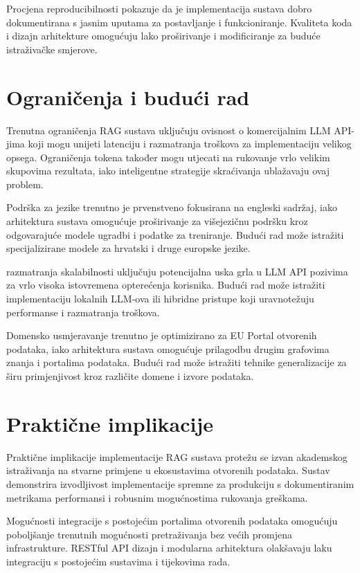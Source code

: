 Procjena reproducibilnosti pokazuje da je implementacija sustava dobro dokumentirana s jasnim uputama za postavljanje i funkcioniranje. Kvaliteta koda i dizajn arhitekture omogućuju lako proširivanje i modificiranje za buduće istraživačke smjerove.

\section{Ograničenja i budući rad}
\label{sec:limitations_future_work}

Trenutna ograničenja RAG sustava uključuju ovisnost o komercijalnim LLM API-jima koji mogu unijeti latenciju i razmatranja troškova za implementaciju velikog opsega. Ograničenja tokena također mogu utjecati na rukovanje vrlo velikim skupovima rezultata, iako inteligentne strategije skraćivanja ublažavaju ovaj problem.

Podrška za jezike trenutno je prvenstveno fokusirana na engleski sadržaj, iako arhitektura sustava omogućuje proširivanje za višejezičnu podršku kroz odgovarajuće modele ugradbi i podatke za treniranje. Budući rad može istražiti specijalizirane modele za hrvatski i druge europske jezike.

razmatranja skalabilnosti uključuju potencijalna uska grla u LLM API pozivima za vrlo visoka istovremena opterećenja korisnika. Budući rad može istražiti implementaciju lokalnih LLM-ova ili hibridne pristupe koji uravnotežuju performanse i razmatranja troškova.

Domensko usmjeravanje trenutno je optimizirano za EU Portal otvorenih podataka, iako arhitektura sustava omogućuje prilagodbu drugim grafovima znanja i portalima podataka. Budući rad može istražiti tehnike generalizacije za širu primjenjivost kroz različite domene i izvore podataka.

\section{Praktične implikacije}
\label{sec:practical_implications}

Praktične implikacije implementacije RAG sustava protežu se izvan akademskog istraživanja na stvarne primjene u ekosustavima otvorenih podataka. Sustav demonstrira izvodljivost implementacije spremne za produkciju s dokumentiranim metrikama performansi i robusnim mogućnostima rukovanja greškama.

Mogućnosti integracije s postojećim portalima otvorenih podataka omogućuju poboljšanje trenutnih mogućnosti pretraživanja bez većih promjena infrastrukture. RESTful API dizajn i modularna arhitektura olakšavaju laku integraciju s postojećim sustavima i tijekovima rada.


